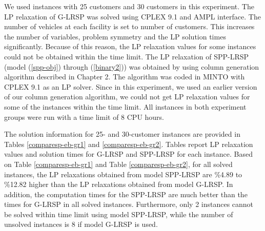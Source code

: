 We used instances with 25 customers and 30 customers in this experiment.
The LP relaxation of G-LRSP was solved using CPLEX 9.1 and AMPL
interface. The number of vehicles at each facility is set to number of
customers. This increases the number of variables, problem symmetry and
the LP solution times significantly. Because of this reason, the LP relaxation
values for some instances could not be obtained within the time limit. The
LP relaxation of SPP-LRSP (model (\ref{spp-obj}) through  (\ref{binary2})) was
obtained by using column generation algorithm described in Chapter 2. The algorithm
was coded in MINTO with CPLEX 9.1 as an LP solver.  Since in this experiment, we used
an earlier version of our column generation algorithm, we could not get
LP relaxation values for some of the instances within the time limit.
All instances in both experiment groups were run with a time limit of 8 CPU
hours.

The solution information for 25- and 30-customer instances are provided in Tables
\ref{comparesp-eb-gr1} and \ref{comparesp-eb-gr2}. Tables report LP relaxation
values and solution times for G-LRSP and SPP-LRSP for each instance.
Based on Table \ref{comparesp-eb-gr1} and Table \ref{comparesp-eb-gr2},
for all solved instances, the LP relaxations obtained from model SPP-LRSP are \%4.89 to
\%12.82 higher than the LP relaxations obtained from model G-LRSP.
In addition, the computation times for the SPP-LRSP are much better than the times
for G-LRSP in all solved instances. Furthermore, only 2 instances cannot be
solved within time limit using model SPP-LRSP, while the number of unsolved instances
is 8 if model G-LRSP is used.

